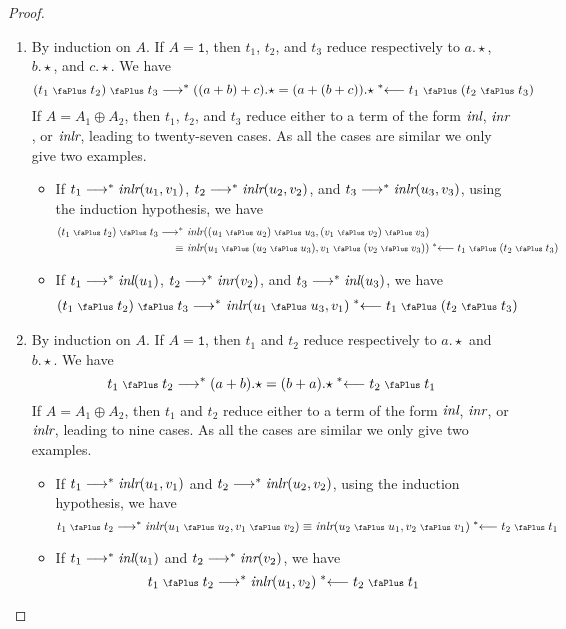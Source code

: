 \documentclass[screen, sigconf,authorversion,nonacm]{acmart}
\theoremstyle{acmdefinition}
\numberwithin{equation}{section}
\newcommand\inl{\mbox{\it inl}}
\newcommand\inr{\mbox{\it inr}}
\newcommand\inlr{\mbox{\it inlr}}
\newcommand\plus{\mathrel{\text{\normalfont\scalebox{0.7}{\faPlus}}}}
\newcommand\lra{\longrightarrow}
\newcommand\lras{\lra^*}
\newcommand\llas{\mathrel{{}^*{\longleftarrow}}}
\newcommand\one{\ensuremath{\mathtt 1}}
\begin{document}
\begin{proof}
  ~
  \begin{enumerate}
    \item By induction on $A$. If $A = \one$, then $t_1$, $t_2$, and $t_3$
      reduce respectively to $a.\star$, $b.\star$, and $c.\star$. We have
      $$(t_1 \plus t_2) \plus t_3 \lras ((a + b) + c).\star = (a + (b +
      c)).\star \llas t_1 \plus (t_2 \plus t_3)$$
      If $A = A_1 \oplus  A_2$, then 
      $t_1$, $t_2$, and $t_3$ reduce either to a term of the form $\inl$, $\inr$, or $\inlr$, leading to twenty-seven cases.
      As all the cases are similar we only give two examples.
      \begin{itemize}
	\item 
	  If $t_1 \lra^* \inlr(u_1,v_1)$, $t_2 \lra^* \inlr(u_2,v_2)$, and
	  $t_3 \lra^* \inlr(u_3,v_3)$, using the induction hypothesis, we
	  have
	  \begin{align*}
	    (t_1 \plus t_2) \plus t_3 \lras &\ 
	    \inlr((u_1 \plus u_2) \plus u_3,(v_1 \plus v_2) \plus v_3)\\
	    \equiv &\ 
	    \inlr(u_1 \plus (u_2 \plus u_3),v_1 \plus (v_2 \plus v_3))
	    \llas t_1 \plus (t_2 \plus t_3)
	  \end{align*}
	\item
	  If $t_1 \lra^* \inl(u_1)$, $t_2 \lra^* \inr(v_2)$, and $t_ 3
	  \lra^* \inl(u_3)$, we have
	  \begin{align*}
	    (t_1 \plus t_2) \plus t_3 \lras &\ 
	    \inlr(u_1 \plus u_3,v_1)
	    \llas t_1 \plus (t_2 \plus t_3)
	  \end{align*}
      \end{itemize}

    \item By induction on $A$.  If $A = \one$, then $t_1$ and $t_2$ reduce
      respectively to $a.\star$ and $b.\star$. We have
      $$t_1 \plus t_2 \lras (a + b).\star = (b + a).\star \llas t_2 \plus t_1$$
      If $A = A_1 \oplus  A_2$, then 
      $t_1$ and $t_2$ reduce either to a term of the form $\inl$, $\inr$, or $\inlr$, leading to nine cases.  As all the cases are similar we only give two examples.
      \begin{itemize}
	\item 
	  If $t_1 \lra^* \inlr(u_1,v_1)$ and $t_2 \lra^*
	  \inlr(u_2,v_2)$, using the induction hypothesis, we have
	  $$t_1 \plus t_2 \lras \inlr(u_1 \plus u_2,v_1 \plus v_2) \equiv
	  \inlr(u_2 \plus u_1,v_2 \plus v_1) \llas t_2 \plus t_1$$

	\item
	  If $t_1 \lra^* \inl(u_1)$ and $t_2 \lra^* \inr(v_2)$, we have
	  $$t_1 \plus t_2 \lras \inlr(u_1,v_2)  \llas t_2 \plus t_1$$
      \end{itemize}


\end{enumerate}
\end{proof}
\end{document}
